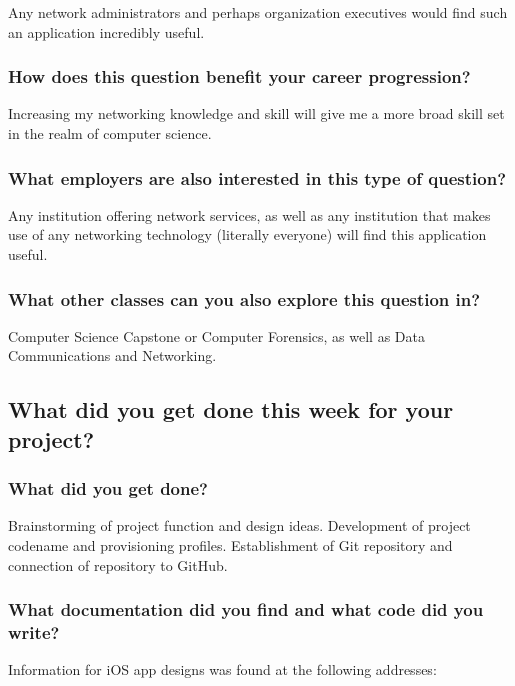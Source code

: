 \documentclass[letterpaper]{article}            %
\begin{document}
Any network administrators and perhaps organization executives would find such an application incredibly useful.

\subsubsection{How does this question benefit your career progression?}

Increasing my networking knowledge and skill will give me a more broad skill set in the realm of computer science.

\subsubsection{What employers are also interested in this type of question?}

Any institution offering network services, as well as any institution that makes use of any networking technology (literally everyone) will find this application useful.

\subsubsection{What other classes can you also explore this question in?}

Computer Science Capstone or Computer Forensics, as well as Data Communications and Networking.

\subsection{What did you get done this week for your project?}

\subsubsection{What did you get done?}

Brainstorming of project function and design ideas. Development of project codename and provisioning profiles. Establishment of Git repository and connection of repository to GitHub.

\subsubsection{What documentation did you find and what code did you write?}

Information for iOS app designs was found at the following addresses:
\end{document}
